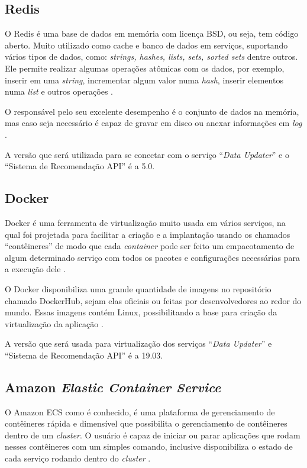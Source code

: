 \subsection{Redis}

O Redis é uma base de dados em memória com licença BSD, ou seja, tem código aberto. Muito utilizado como cache e banco de dados em serviços, suportando vários tipos de dados, como: \textit{strings, hashes, lists, sets, sorted sets} dentre outros. Ele permite realizar algumas operações atômicas com os dados, por exemplo, inserir em uma \textit{string}, incrementar algum valor numa \textit{hash}, inserir elementos numa \textit{list} e outros operações \cite{redis:2019}.

O responsável pelo seu excelente desempenho é o conjunto de dados na memória, mas caso seja necessário é capaz de gravar em disco ou anexar informações em \textit{log} \cite{redis:2019}.

A versão que será utilizada para se conectar com o serviço “\textit{Data Updater}” e o “Sistema de Recomendação API” é a 5.0.

\subsection{Docker}

Docker é uma ferramenta de virtualização muito usada em vários serviços, na qual foi projetada para facilitar a criação e a implantação usando os chamados “contêineres” de modo que cada \textit{container} pode ser feito um empacotamento de algum determinado serviço com todos os pacotes e configurações necessárias para a execução dele \cite{OPENSOURCE.COM:2019}.

O Docker disponibiliza uma grande quantidade de imagens no repositório chamado DockerHub, sejam elas oficiais ou feitas por desenvolvedores ao redor do mundo. Essas imagens contém Linux, possibilitando a base para criação da virtualização da aplicação \cite{DOCKERHUB:2019}.

A versão que será usada para virtualização dos serviços “\textit{Data Updater}” e “Sistema de Recomendação API” é a 19.03.

\subsection{Amazon \textit{Elastic Container Service}}

O Amazon ECS como é conhecido, é uma plataforma de gerenciamento de contêineres rápida e dimensível que possibilita o gerenciamento de contêineres dentro de um \textit{cluster}. O usuário é capaz de iniciar ou parar aplicações que rodam nesses contêineres com um simples comando, inclusive disponibiliza o estado de cada serviço rodando dentro do \textit{cluster} \cite{amazonECS:2019}.

